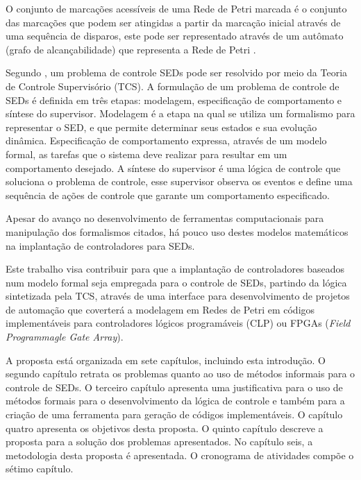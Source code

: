 O conjunto de marca\c{c}\~oes acess\'iveis de uma Rede de Petri marcada \'e o conjunto das marca\c{c}\~oes que podem ser atingidas a partir da marca\c{c}\~ao inicial atrav\'es de uma sequ\^encia de disparos, este pode ser representado atrav\'es de um aut\^omato (grafo de alcan\c{c}abilidade) que representa a Rede de Petri \cite{Janette}.

Segundo \cite{Montgomery2004}, um problema de controle SEDs pode ser resolvido por meio da Teoria de Controle Supervis\'orio (TCS). A formula\c{c}\~ao de um problema de controle de SEDs \'e definida em tr\^es etapas: modelagem, especifica\c{c}\~ao de comportamento e s\'intese do supervisor. Modelagem \'e a etapa na qual se utiliza um formalismo para representar o SED, e que permite determinar seus estados e sua evolu\c{c}\~ao din\^amica. Especifica\c{c}\~ao de comportamento expressa, atrav\'es de um modelo formal, as tarefas que o sistema deve realizar para resultar em um comportamento desejado. A s\'intese do supervisor \'e uma l\'ogica de controle que soluciona o problema de controle, esse supervisor observa os eventos e define uma sequ\^encia de a\c{c}\~oes de controle que garante um comportamento especificado.

Apesar do avan\c{c}o no desenvolvimento de ferramentas computacionais para manipula\c{c}\~ao dos formalismos citados, h\'a pouco uso destes modelos matem\'aticos na implanta\c{c}\~ao de controladores para SEDs.

Este trabalho visa contribuir para que a implanta\c{c}\~ao de controladores baseados num modelo formal seja empregada para o controle de SEDs, partindo da l\'ogica sintetizada pela TCS, atrav\'es de uma interface para desenvolvimento de projetos de automa\c{c}\~ao que coverter\'a a modelagem em Redes de Petri em c\'odigos implement\'aveis para controladores l\'ogicos program\'aveis (CLP) ou FPGAs (\textit{Field Programmagle Gate Array}).

A proposta est\'a organizada em sete cap\'itulos, incluindo esta introdu\c{c}\~ao. O segundo cap\'itulo retrata os problemas quanto ao uso de m\'etodos informais para o controle de SEDs. O terceiro cap\'itulo apresenta uma justificativa para o uso de m\'etodos formais para o desenvolvimento da l\'ogica de controle e tamb\'em para a cria\c{c}\~ao de uma ferramenta para gera\c{c}\~ao de c\'odigos implement\'aveis. O cap\'itulo quatro apresenta os objetivos desta proposta. O quinto cap\'itulo descreve a proposta para a solu\c{c}\~ao dos problemas apresentados. No cap\'itulo seis, a metodologia desta proposta \'e apresentada. O cronograma de atividades comp\~oe o s\'etimo cap\'itulo.

